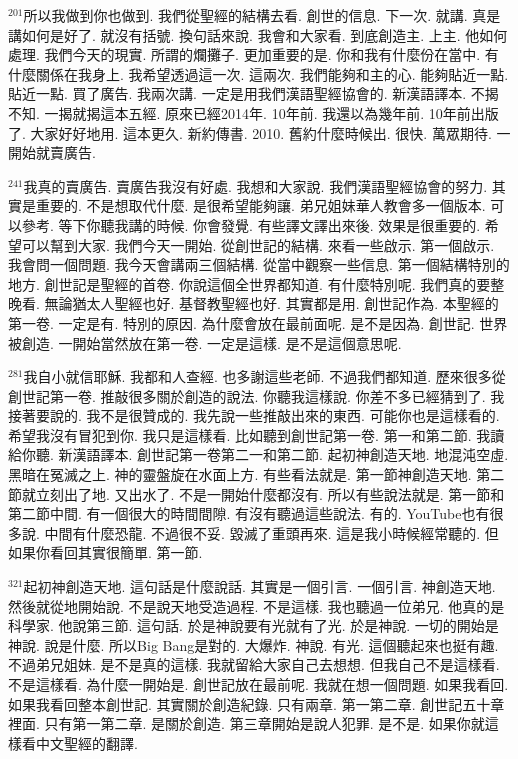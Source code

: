 \documentclass{book}
\begin{document}
$^{201}$所以我做到你也做到.
我們從聖經的結構去看.
創世的信息.
下一次.
就講.
真是講如何是好了.
就沒有括號.
換句話來說.
我會和大家看.
到底創造主.
上主.
他如何處理.
我們今天的現實.
所謂的爛攤子.
更加重要的是.
你和我有什麼份在當中.
有什麼關係在我身上.
我希望透過這一次.
這兩次.
我們能夠和主的心.
能夠貼近一點.
貼近一點.
買了廣告.
我兩次講.
一定是用我們漢語聖經協會的.
新漢語譯本.
不揭不知.
一揭就揭這本五經.
原來已經2014年.
10年前.
我還以為幾年前.
10年前出版了.
大家好好地用.
這本更久.
新約傳書.
2010.
舊約什麼時候出.
很快.
萬眾期待.
一開始就賣廣告.

$^{241}$我真的賣廣告.
賣廣告我沒有好處.
我想和大家說.
我們漢語聖經協會的努力.
其實是重要的.
不是想取代什麼.
是很希望能夠讓.
弟兄姐妹華人教會多一個版本.
可以參考.
等下你聽我講的時候.
你會發覺.
有些譯文譯出來後.
效果是很重要的.
希望可以幫到大家.
我們今天一開始.
從創世記的結構.
來看一些啟示.
第一個啟示.
我會問一個問題.
我今天會講兩三個結構.
從當中觀察一些信息.
第一個結構特別的地方.
創世記是聖經的首卷.
你說這個全世界都知道.
有什麼特別呢.
我們真的要整晚看.
無論猶太人聖經也好.
基督教聖經也好.
其實都是用.
創世記作為.
本聖經的第一卷.
一定是有.
特別的原因.
為什麼會放在最前面呢.
是不是因為.
創世記.
世界被創造.
一開始當然放在第一卷.
一定是這樣.
是不是這個意思呢.

$^{281}$我自小就信耶穌.
我都和人查經.
也多謝這些老師.
不過我們都知道.
歷來很多從創世記第一卷.
推敲很多關於創造的說法.
你聽我這樣說.
你差不多已經猜到了.
我接著要說的.
我不是很贊成的.
我先說一些推敲出來的東西.
可能你也是這樣看的.
希望我沒有冒犯到你.
我只是這樣看.
比如聽到創世記第一卷.
第一和第二節.
我讀給你聽.
新漢語譯本.
創世記第一卷第二一和第二節.
起初神創造天地.
地混沌空虛.
黑暗在冤滅之上.
神的靈盤旋在水面上方.
有些看法就是.
第一節神創造天地.
第二節就立刻出了地.
又出水了.
不是一開始什麼都沒有.
所以有些說法就是.
第一節和第二節中間.
有一個很大的時間間隙.
有沒有聽過這些說法.
有的.
YouTube也有很多說.
中間有什麼恐龍.
不過很不妥.
毀滅了重頭再來.
這是我小時候經常聽的.
但如果你看回其實很簡單.
第一節.

$^{321}$起初神創造天地.
這句話是什麼說話.
其實是一個引言.
一個引言.
神創造天地.
然後就從地開始說.
不是說天地受造過程.
不是這樣.
我也聽過一位弟兄.
他真的是科學家.
他說第三節.
這句話.
於是神說要有光就有了光.
於是神說.
一切的開始是神說.
說是什麼.
所以Big Bang是對的.
大爆炸.
神說.
有光.
這個聽起來也挺有趣.
不過弟兄姐妹.
是不是真的這樣.
我就留給大家自己去想想.
但我自己不是這樣看.
不是這樣看.
為什麼一開始是.
創世記放在最前呢.
我就在想一個問題.
如果我看回.
如果我看回整本創世記.
其實關於創造紀錄.
只有兩章.
第一第二章.
創世記五十章裡面.
只有第一第二章.
是關於創造.
第三章開始是說人犯罪.
是不是.
如果你就這樣看中文聖經的翻譯.
\end{document}

